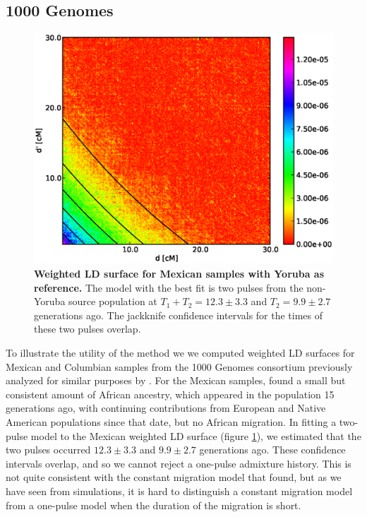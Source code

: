 \subsection{1000 Genomes}
\begin{figure}
\includegraphics[scale=.6]{MXL.eps}
\caption{
{\bf Weighted LD surface for Mexican samples with Yoruba as reference.} The model with the best fit is two pulses from the non-Yoruba source population at $T_1+T_2=12.3 \pm 3.3$ and $T_2=9.9\pm 2.7$ generations ago. The jackknife confidence intervals for the times of these two pulses overlap. 
}
\label{ASH_MXL}
\end{figure}

To illustrate the utility of the method we we computed weighted LD surfaces for Mexican and Columbian samples from the 1000 Genomes consortium previously analyzed for similar purposes by \cite{gravel2013reconstructing}. For the Mexican samples, \cite{gravel2013reconstructing} found a small but consistent amount of African ancestry, which appeared in the population 15 generations ago, with continuing contributions from European and Native American populations since that date, but no African migration. In fitting a two-pulse model to the Mexican weighted LD surface (figure \ref{ASH_MXL}), we estimated that the two pulses occurred $12.3\pm3.3$ and $9.9\pm2.7$ generations ago. These confidence intervals overlap, and so we cannot reject a one-pulse admixture history. This is not quite consistent with the constant migration model that \cite{gravel2013reconstructing} found, but as we have seen from simulations, it is hard to distinguish a constant migration model from a one-pulse model when the duration of the migration is short.


